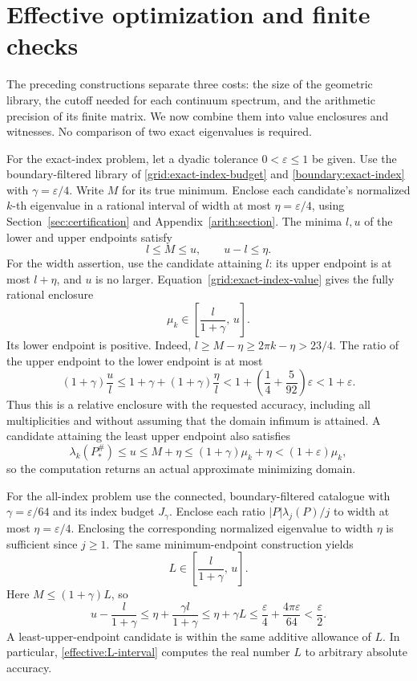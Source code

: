 \documentclass[11pt,reqno]{amsart}
\numberwithin{equation}{section}
\newcommand{\abs}[1]{\lvert#1\rvert}
\begin{document}
\section{Effective optimization and finite checks}\label{sec:effective}

The preceding constructions separate three costs: the size of the
geometric library, the cutoff needed for each continuum spectrum,
and the arithmetic precision of its finite matrix.  We now combine
them into value enclosures and witnesses.  No comparison of two
exact eigenvalues is required.

For the exact-index problem, let a dyadic tolerance
\(0<\varepsilon\le1\) be given.  Use the boundary-filtered library
of \eqref{grid:exact-index-budget} and
\eqref{boundary:exact-index} with \(\gamma=\varepsilon/4\).
Write \(M\) for its true minimum.  Enclose each candidate's
normalized \(k\)-th eigenvalue in a rational interval of width
at most \(\eta=\varepsilon/4\), using
Section~\ref{sec:certification} and Appendix~\ref{arith:section}.
The minima \(l,u\) of the lower and upper endpoints satisfy
\[
 l\le M\le u,\qquad u-l\le\eta.
\]
For the width assertion, use the candidate attaining \(l\):
its upper endpoint is at most \(l+\eta\), and \(u\) is no
larger.  Equation~\eqref{grid:exact-index-value} gives the
fully rational enclosure
\begin{equation}\label{effective:mu-interval}
 \mu_k\in\left[\frac{l}{1+\gamma},\,u\right].
\end{equation}
Its lower endpoint is positive.  Indeed,
\(l\ge M-\eta\ge2\pi k-\eta>23/4\).
The ratio of the upper endpoint to the lower endpoint is at most
\[
 (1+\gamma)\frac ul
 \le 1+\gamma+(1+\gamma)\frac{\eta}{l}
 <1+\left(\frac14+\frac5{92}\right)\varepsilon
 <1+\varepsilon.
\]
Thus this is a relative enclosure with the requested accuracy,
including all multiplicities and without assuming that the
domain infimum is attained.  A candidate attaining the least
upper endpoint also satisfies
\[
 \lambda_k(P_*^\#)\le u\le M+\eta
 \le(1+\gamma)\mu_k+\eta<(1+\varepsilon)\mu_k,
\]
so the computation returns an actual approximate minimizing domain.

For the all-index problem use the connected, boundary-filtered
catalogue with \(\gamma=\varepsilon/64\) and its index budget
\(J_\gamma\).  Enclose each ratio
\(\abs P\lambda_j(P)/j\) to width at most
\(\eta=\varepsilon/4\).  Enclosing the corresponding normalized
eigenvalue to width \(\eta\) is sufficient since \(j\ge1\).
The same minimum-endpoint construction yields
\begin{equation}\label{effective:L-interval}
 L\in\left[\frac{l}{1+\gamma},\,u\right].
\end{equation}
Here \(M\le(1+\gamma)L\), so
\[
 u-\frac{l}{1+\gamma}
 \le\eta+\frac{\gamma l}{1+\gamma}
 \le\eta+\gamma L
 \le\frac{\varepsilon}{4}
       +\frac{4\pi\varepsilon}{64}<\frac{\varepsilon}{2}.
\]
A least-upper-endpoint candidate is within the same additive
allowance of \(L\).  In particular, \eqref{effective:L-interval}
computes the real number \(L\) to arbitrary absolute accuracy.
\end{document}
